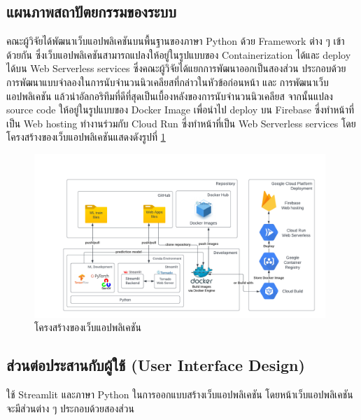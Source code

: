 \documentclass[12pt,oneside,openright,a4paper]{cpe-thai-project}
\begin{document}
\subsection{แผนภาพสถาปัตยกรรมของระบบ}
คณะผู้วิจัยได้พัฒนาเว็บแอปพลิเคชันบนพื้นฐานของภาษา Python ด้วย Framework ต่าง ๆ เข้าด้วยกัน ซึ่งเว็บแอปพลิเคชันสามารถแปลงให้อยู่ในรูปแบบของ Containerization ได้และ deploy ได้บน Web Serverless services ซึ่งคณะผู้วิจัยได้แยกการพัฒนาออกเป็นสองส่วน ประกอบด้วย การพัฒนาแบบจําลองในการนับจํานวนนิวเคลียสที่กล่าวในหัวข้อก่อนหน้า และ การพัฒนาเว็บแอปพลิเคชัน แล้วนำอัลกอริทึมที่ดีที่สุดเป็นเบื้องหลังของการนับจำนวนนิวเคลียส จากนั้นแปลง source code ให้อยู่ในรูปแบบของ Docker Image เพื่อนำไป deploy บน Firebase ซี่งทำหน้าที่เป็น Web hosting ทำงานร่วมกับ Cloud Run ซี่งทำหน้าที่เป็น Web Serverless services โดยโครงสร้างของเว็บแอปพลิเคชันแสดงดังรูปที่ \ref{fig:Webapparch}
\begin{figure}[!h]
    \centering
    \includegraphics[width=11cm]{images/Webappstr.png}
    \caption{โครงสร้างของเว็บแอปพลิเคชัน}
    \label{fig:Webapparch}
\end{figure}
\subsection{ส่วนต่อประสานกับผู้ใช้ (User Interface Design)}
ใช้ Streamlit และภาษา Python ในการออกแบบสร้างเว็บแอปพลิเคชัน โดยหน้าเว็บแอปพลิเคชันจะมีส่วนต่าง ๆ ประกอบด้วยสองส่วน 
\end{document}
